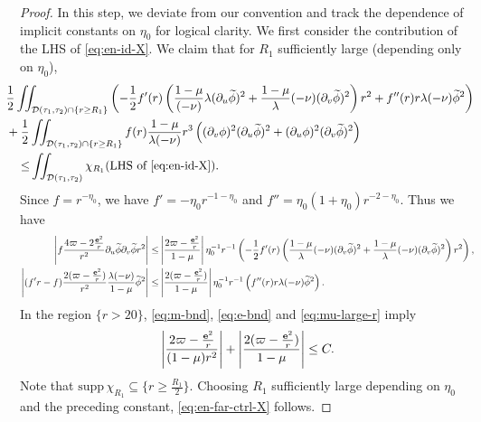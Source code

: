 \documentclass[10pt, reqno]{amsart}
\theoremstyle{definition}
\theoremstyle{remark}
\theoremstyle{conjecture}
\numberwithin{equation}{section}
\newcommand{\set}[1]{\{#1\}}
\newcommand{\rd}{\partial}
\newcommand{\0}{\emptyset}
\newcommand{\lmb}{\lambda}
\newcommand{\bfe}{{\bf e}}
\newcommand{\calD}{\mathcal D}
\newcommand{\dur}{\nu}
\newcommand{\dvr}{\lmb}
\newcommand{\e}{\bfe}							%
\newcommand{\phibg}{\overline{\phi}}				%
\newcommand{\phidf}{\widetilde{\phi}}				%
\newcommand{\Abs}[1]{\left\vert #1 \right\vert}
\begin{document}
\begin{proof}
In this step, we deviate from our convention and track the dependence of implicit constants on $\eta_{0}$ for logical clarity.
We first consider the contribution of the LHS of \eqref{eq:en-id-X}. We claim that for $R_{1}$ sufficiently large (depending only on $\eta_{0}$),
\begin{equation} \label{eq:en-far-ctrl-X}
\begin{aligned}
& \hskip-2em
\frac{1}{2} \iint_{\calD(\tau_{1}, \tau_{2}) \cap \set{r \geq R_{1}}} 
	\left( -\frac{1}{2} f'(r)  \left( \frac{1-\mu}{(-\dur)} \dvr (\rd_{u} \phidf)^{2} + \frac{1-\mu}{\dvr} (-\dur) (\rd_{v} \phidf)^{2} \right) r^{2} 
	+ f''(r) r \dvr (-\dur) \phidf^{2} \right) \\
& \hskip-2em
+ \frac{1}{2} \iint_{\calD(\tau_{1}, \tau_{2}) \cap \set{r \geq R_{1}}}
		f(r) \frac{1-\mu}{\dvr (-\dur)} r^{3} \left((\rd_{v} \phi)^{2} (\rd_{u} \phidf)^{2} + (\rd_{u} \phi)^{2} (\rd_{v} \phidf)^{2} \right) \\
\leq &
\iint_{\calD(\tau_{1}, \tau_{2})} \chi_{R_{1}} (\hbox{LHS of \eqref{eq:en-id-X}}).
\end{aligned}
\end{equation}
Since $f = r^{-\eta_{0}}$, we have $f' = -\eta_{0} r^{-1-\eta_{0}}$ and $f'' = \eta_{0} (1+\eta_{0}) r^{-2-\eta_{0}}$. 
Thus we have
\begin{align*}
	\Abs{f \frac{4 \varpi - 2 \frac{\e^{2}}{r}}{r^{2}} \rd_{u} \phidf \rd_{v} \phidf r^{2}}
	\leq & \Abs{\frac{2 \varpi - \frac{\e^{2}}{r}}{1-\mu}} \eta_{0}^{-1} r^{-1} \left(-\frac{1}{2} f'(r)  \left( \frac{1-\mu}{\dvr} (-\dur) (\rd_{v} \phidf)^{2} + \frac{1-\mu}{\dvr} (-\dur) (\rd_{v} \phidf)^{2} \right) r^{2} \right), \\
	\Abs{(f' r - f) \frac{2(\varpi - \frac{\e^{2}}{r})}{r^{2}} \frac{\dvr (-\dur)}{1-\mu} \phidf^{2}}
	\leq & \Abs{\frac{2(\varpi - \frac{\e^{2}}{r})}{1-\mu}} \eta_{0}^{-1} r^{-1} \left( f''(r) r \dvr (-\dur) \phidf^{2} \right).
\end{align*}
In the region $\set{r > 20}$, \eqref{eq:m-bnd}, \eqref{eq:e-bnd} and \eqref{eq:mu-large-r} imply
\begin{equation*}
\Abs{\frac{2 \varpi - \frac{\e^{2}}{r}}{(1-\mu) r^{2}}} + \Abs{\frac{2(\varpi - \frac{\e^{2}}{r})}{1-\mu}} \leq C.
\end{equation*}
Note that $\mathrm{supp}\,\chi_{R_{1}} \subseteq \set{r \geq \frac{R_{1}}{2}}$. Choosing $R_{1}$ sufficiently large depending on $\eta_{0}$ and the preceding constant, \eqref{eq:en-far-ctrl-X} follows.


\end{proof}
\end{document}
